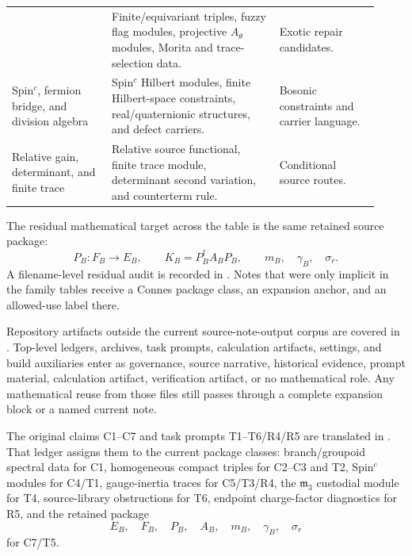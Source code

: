 \documentclass[11pt]{article}
\newcommand{\mthree}{\mathfrak m_3}
\begin{document}
\begin{center}
\begin{tabular}{@{}L{0.25\linewidth}L{0.42\linewidth}L{0.25\linewidth}@{}}
  & Finite/equivariant triples, fuzzy flag modules, projective
    \(A_\theta\) modules, Morita and trace-selection data.
  & Exotic repair candidates. \\
Spin\({}^c\), fermion bridge, and division algebra
  & Spin\({}^c\) Hilbert modules, finite Hilbert-space constraints,
    real/quaternionic structures, and defect carriers.
  & Bosonic constraints and carrier language. \\
Relative gain, determinant, and finite trace
  & Relative source functional, finite trace module, determinant second
    variation, and counterterm rule.
  & Conditional source routes. \\
\bottomrule
\end{tabular}
\end{center}

The residual mathematical target across the table is the same retained source
package:
\[
  P_B:F_B\to E_B,\qquad
  K_B=P_B^\dagger A_BP_B,\qquad
  m_B,\quad \gamma_B,\quad \sigma_r.
\]
A filename-level residual audit is recorded in
\cite{ncg-file-residual-coverage}.  Notes that were only implicit in the
family tables receive a Connes package class, an expansion anchor, and an
allowed-use label there.

Repository artifacts outside the current source-note-output corpus are
covered in \cite{ncg-repository-artifact-coverage}.  Top-level ledgers,
archives, task prompts, calculation artifacts, settings, and build auxiliaries
enter as governance, source narrative, historical evidence, prompt material,
calculation artifact, verification artifact, or no mathematical role.  Any
mathematical reuse from those files still passes through a complete expansion
block or a named current note.

The original claims C1--C7 and task prompts T1--T6/R4/R5 are translated in
\cite{ncg-claim-task-ledger}.  That ledger assigns them to the current package
classes: branch/groupoid spectral data for C1, homogeneous compact triples for
C2--C3 and T2, Spin\({}^c\) modules for C4/T1, gauge-inertia traces for
C5/T3/R4, the \(\mthree\) custodial module for T4, source-library obstructions
for T6, endpoint charge-factor diagnostics for R5, and the retained package
\[
  E_B,\quad F_B,\quad P_B,\quad A_B,\quad m_B,\quad \gamma_B,\quad \sigma_r
\]
for C7/T5.
\end{document}
